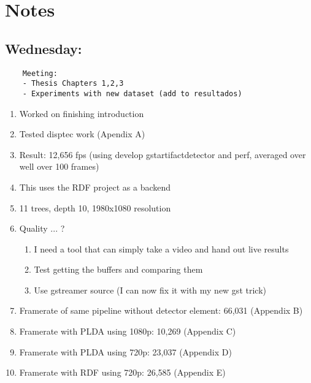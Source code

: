 \documentclass[12pt,oneside]{book}
\begin{document}
  \newpage

  \section*{Notes}
  \setlength\parindent{0pt}

  \subsection*{Wednesday:}
  \begin{lstlisting}
    Meeting:
    - Thesis Chapters 1,2,3
    - Experiments with new dataset (add to resultados)
  \end{lstlisting}

  \begin{enumerate}
    \item Worked on finishing introduction
    \item Tested disptec work (Apendix A)
    \item Result: 12,656 fps (using develop gstartifactdetector and perf, averaged over well over 100 frames)
    \item This uses the RDF project as a backend
    \item 11 trees, depth 10, 1980x1080 resolution
    \item Quality ... ?
    \begin{enumerate}
      \item I need a tool that can simply take a video and hand out live results
      \item Test getting the buffers and comparing them
      \item Use gstreamer source (I can now fix it with my new gst trick)
    \end{enumerate}
    \item Framerate of same pipeline without detector element: 66,031 (Appendix B)
    \item Framerate with PLDA using 1080p: 10,269 (Appendix C)
    \item Framerate with PLDA using  720p: 23,037 (Appendix D)
    \item Framerate with RDF using  720p: 26,585 (Appendix E)
  \end{enumerate}
\end{document}
